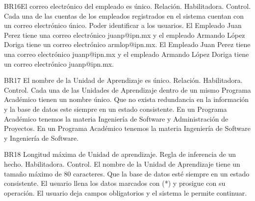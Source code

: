 \begin{BussinesRule}{BR16}{El correo electrónico del empleado es único.}
    \BRitem[Tipo: ]Relación.
    \BRitem[Clase: ]Habilitadora.
    \BRitem[Nivel: ]Control.
    \BRitem[Descripción:] Cada una de las cuentas de los empleados registrados en el sistema cuentan con un correo electrónico único.
    \BRitem[Motivación: ]Poder identificar a los usuarios.
     El Empleado Juan Perez tiene una correo electrónico juanp@ipn.mx  y el empleado Armando López Doriga tiene un correo electrónico armlop@ipn.mx.
     El Empleado Juan Perez tiene una correo electrónico juanp@ipn.mx  y el empleado Armando López Doriga tiene un correo electrónico juanp@ipn.mx.
\end{BussinesRule}
\begin{BussinesRule}{BR17} {El nombre de la Unidad de Aprendizaje es único.}
    \BRitem[Tipo: ]Relación.
    \BRitem[Clase: ]Habilitadora.
    \BRitem[Nivel: ]Control.
    \BRitem[Descripción: ]Cada  una de las Unidades de Aprendizaje dentro de un mismo Programa Académico tienen un nombre único.
    \BRitem[Motivación: ] Que no exista redundancia en la información y la base de datos este siempre en un estado consistente.
     En un Programa Académico  tenemos la materia Ingeniería de Software y Administración de Proyectos.
    En un Programa Académico  tenemos la materia Ingeniería de Software y  Ingeniería de Software.
\end{BussinesRule}
\begin{BussinesRule}{BR18}{ Longitud máxima de Unidad de aprendizaje.}
    \BRitem[Tipo: ]Regla de inferencia de un hecho.
    \BRitem[Clase: ]Habilitadora.
    \BRitem[Nivel: ]Control.
    \BRitem[Descripción: ]El nombre de la Unidad de Aprendizaje tiene un tamaño máximo de 80 caracteres.
    \BRitem[Sentencia:]
    \BRitem[Motivación: ]Que la base de datos esté siempre en un estado consistente.
     El usuario llena los datos marcados con (*) y prosigue con su operación.
    El usuario deja campos obligatorios y el sistema le permite continuar.
\end{BussinesRule}
